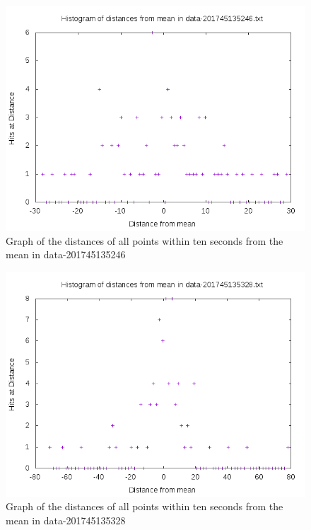 \documentclass[10pt,letterpaper]{article}
\begin{document}
\begin{figure}[h]
\centering
\includegraphics[scale=0.5]{data-201745135246.png}
\caption{\label{fig:data-201745135246.png}Graph of the distances of all points within ten seconds from the mean in data-201745135246}
\end{figure}
\begin{figure}[h]
\centering
\includegraphics[scale=0.5]{data-201745135328.png}
\caption{\label{fig:data-201745135328.png}Graph of the distances of all points within ten seconds from the mean in data-201745135328}
\end{figure}
\end{document}
